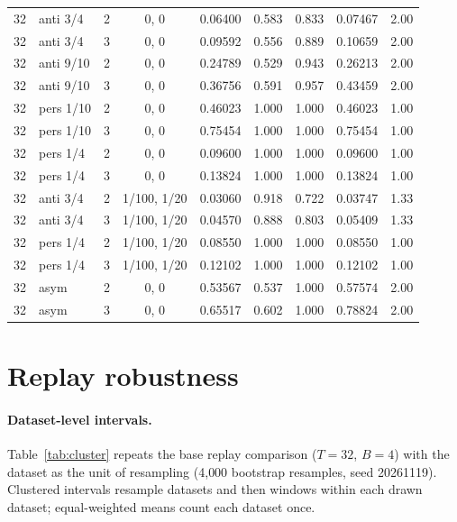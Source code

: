 \documentclass{article}
\theoremstyle{plain}
\theoremstyle{definition}
\theoremstyle{remark}
\begin{document}
\begin{longtable}{rlrcrrrrr}
32 & anti 3/4 & 2 & 0, 0 & 0.06400 & 0.583 & 0.833 & 0.07467 & 2.00\\
32 & anti 3/4 & 3 & 0, 0 & 0.09592 & 0.556 & 0.889 & 0.10659 & 2.00\\
32 & anti 9/10 & 2 & 0, 0 & 0.24789 & 0.529 & 0.943 & 0.26213 & 2.00\\
32 & anti 9/10 & 3 & 0, 0 & 0.36756 & 0.591 & 0.957 & 0.43459 & 2.00\\
32 & pers 1/10 & 2 & 0, 0 & 0.46023 & 1.000 & 1.000 & 0.46023 & 1.00\\
32 & pers 1/10 & 3 & 0, 0 & 0.75454 & 1.000 & 1.000 & 0.75454 & 1.00\\
32 & pers 1/4 & 2 & 0, 0 & 0.09600 & 1.000 & 1.000 & 0.09600 & 1.00\\
32 & pers 1/4 & 3 & 0, 0 & 0.13824 & 1.000 & 1.000 & 0.13824 & 1.00\\
32 & anti 3/4 & 2 & 1/100, 1/20 & 0.03060 & 0.918 & 0.722 & 0.03747 & 1.33\\
32 & anti 3/4 & 3 & 1/100, 1/20 & 0.04570 & 0.888 & 0.803 & 0.05409 & 1.33\\
32 & pers 1/4 & 2 & 1/100, 1/20 & 0.08550 & 1.000 & 1.000 & 0.08550 & 1.00\\
32 & pers 1/4 & 3 & 1/100, 1/20 & 0.12102 & 1.000 & 1.000 & 0.12102 & 1.00\\
32 & asym & 2 & 0, 0 & 0.53567 & 0.537 & 1.000 & 0.57574 & 2.00\\
32 & asym & 3 & 0, 0 & 0.65517 & 0.602 & 1.000 & 0.78824 & 2.00\\
\bottomrule
\end{longtable}

\section{Replay robustness}
\label{app:replay12}

\paragraph{Dataset-level intervals.} Table~\ref{tab:cluster} repeats the base replay comparison ($T=32$, $B=4$) with the dataset as the unit of resampling (4{,}000 bootstrap resamples, seed 20261119). Clustered intervals resample datasets and then windows within each drawn dataset; equal-weighted means count each dataset once.
\end{document}
